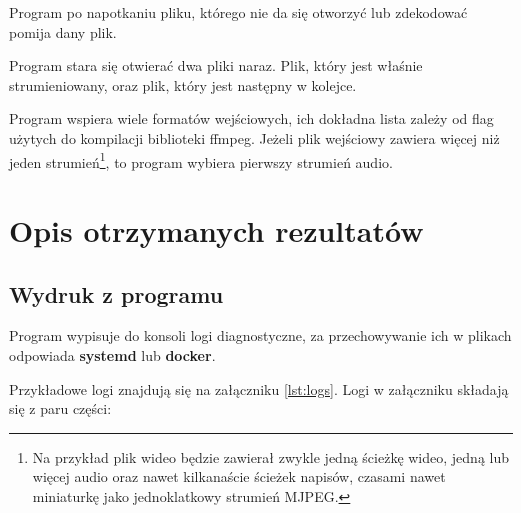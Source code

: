 \documentclass[a4paper,12pt]{article}
\begin{document}
Program po napotkaniu pliku, którego nie da się otworzyć lub zdekodować pomija
dany plik. 

Program stara się otwierać dwa pliki naraz. Plik, który jest właśnie
strumieniowany, oraz plik, który jest następny w kolejce.

Program wspiera wiele formatów wejściowych, ich dokładna lista zależy od flag
użytych do kompilacji biblioteki ffmpeg. Jeżeli plik wejściowy zawiera więcej
niż jeden strumień\footnote{Na przykład plik wideo będzie zawierał zwykle jedną
ścieżkę wideo, jedną lub więcej audio oraz nawet kilkanaście ścieżek napisów,
czasami nawet miniaturkę jako jednoklatkowy strumień MJPEG.}, to program wybiera
pierwszy strumień audio.

\section{Opis otrzymanych rezultatów}

\subsection*{Wydruk z programu}

Program wypisuje do konsoli logi diagnostyczne, za przechowywanie ich w plikach
odpowiada \textbf{systemd} lub \textbf{docker}.

Przykładowe logi znajdują się na załączniku \ref{lst:logs}. Logi w załączniku 
składają się z paru części:
\end{document}
